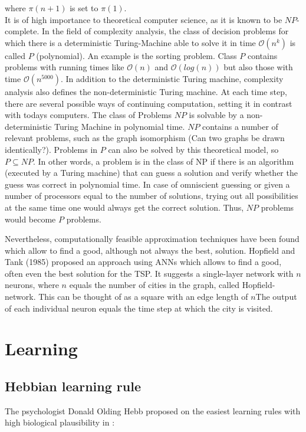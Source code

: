 \documentclass[10pt,a4paper,DIV=11]{scrreprt}
\begin{document}
where $\pi(n+1)$ is set to $\pi(1)$.\cite{MATHINF}\\

It is of high importance to theoretical computer science, as it is known to be $NP$-complete. In the field of complexity analysis, the class of decision problems for which there is a deterministic Turing-Machine able to solve it in time $\mathcal{O}(n^k)$ is called $P$ (polynomial). An example is the sorting problem. Class $P$ contains problems with running times like $\mathcal{O}(n)$ and $\mathcal{O}(log(n))$ but also those with time $\mathcal{O}(n^{5000})$. In addition to the deterministic Turing machine, complexity analysis also defines the non-deterministic Turing machine. At each time step, there are several possible ways of continuing computation, setting it in contrast with todays computers. The class of Problems $NP$ is solvable by a non-deterministic Turing Machine in polynomial time. $NP$ contains a number of relevant problems, such as the graph isomorphism (Can two graphs be drawn identically?). Problems in $P$ can also be solved by this theoretical model, so $P \subseteq NP$. In other words, a problem is in the class of NP if there is an algorithm (executed by a Turing machine) that can guess a solution and verify whether the guess was correct in polynomial time. In case of omniscient guessing or given a number of processors equal to the number of solutions, trying out all possibilities at the same time one would always get the correct solution. Thus, $NP$ problems would become $P$ problems. 

Nevertheless, computationally feasible approximation techniques have been found which allow to find a good, although not always the best, solution. Hopfield and Tank (1985) proposed an approach using ANNs which allows to find a good, often even the best solution for the TSP. It suggests a single-layer network with $n$ neurons, where $n$ equals the number of cities in the graph, called Hopfield-network. This can be thought of as a square with an edge length of $n$The output of each individual neuron equals the time step at which the city is visited. 







\chapter{Learning}\label{sec:learning}
\section{Hebbian learning rule}
The psychologist Donald Olding Hebb proposed on the easiest learning rules with high biological plausibility in \cite{HEBB}:\\
\end{document}
